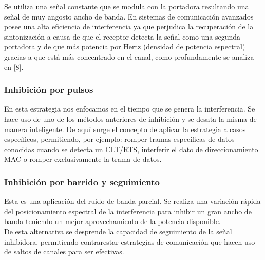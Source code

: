 \documentclass[12pt]{report}
\begin{document}
Se utiliza una señal constante que se modula con la portadora resultando una señal de muy angosto ancho de banda. En sistemas de comunicación 
avanzados posee una alta eficiencia de interferencia ya que perjudica la recuperación de la sintonización a causa de que el receptor detecta 
la señal como una segunda portadora y de que más potencia por Hertz (densidad de potencia espectral) gracias a que está más concentrado
en el canal, como profundamente se analiza en [8].

\subsubsection{Inhibición por pulsos}

En esta estrategia nos enfocamos en el tiempo que se genera la interferencia. Se hace uso de uno de los métodos anteriores de inhibición
y se desata la misma de manera inteligente. De aquí surge el concepto de aplicar la estrategia a casos específicos, permitiendo, por ejemplo:
romper tramas específicas de datos conocidas cuando se detecta un CLT/RTS, interferir el dato de direccionamiento MAC o romper exclusivamente
la trama de datos.

\subsubsection{Inhibición por barrido y seguimiento}

Esta es una aplicación del ruido de banda parcial. Se realiza una variación rápida del posicionamiento espectral de la interferencia para inhibir
un gran ancho de banda teniendo un mejor aprovechamiento de la potencia disponible.\\
De esta alternativa se desprende la capacidad de seguimiento de la señal inhibidora, permitiendo contrarestar estrategias de comunicación que 
hacen uso de saltos de canales para ser efectivas.
\end{document}
